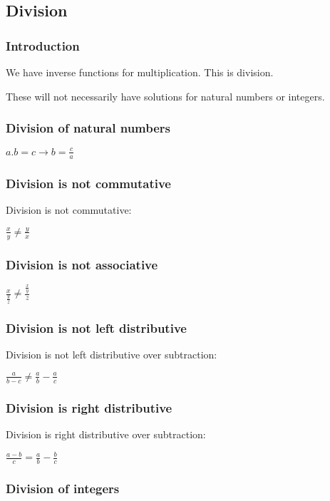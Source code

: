 
\subsection{Division}

\subsubsection{Introduction}

We have inverse functions for multiplication. This is division.

These will not necessarily have solutions for natural numbers or integers. 

\subsubsection{Division of natural numbers}

$a.b=c\rightarrow b=\frac{c}{a}$
	
\subsubsection{Division is not commutative}

Division is not commutative:

$\frac{x}{y}\ne \frac{y}{x}$

\subsubsection{Division is not associative}

$\frac{x}{\frac{y}{z}}\ne \frac{\frac{x}{y}}{z}$

\subsubsection{Division is not left distributive}

Division is not left distributive over subtraction:

$\frac{a}{b-c} \ne \frac{a}{b} -\frac{a}{c}$

\subsubsection{Division is right distributive}

Division is right distributive over subtraction:

$\frac{a-b}{c} =\frac{a}{b} -\frac{b}{c}$
	


\subsubsection{Division of integers}

